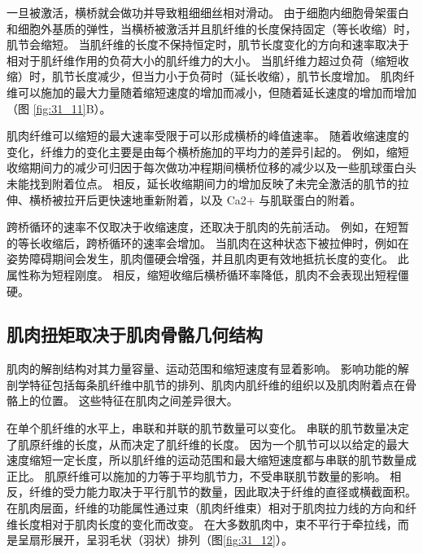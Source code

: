 一旦被激活，横桥就会做功并导致粗细细丝相对滑动。
由于细胞内细胞骨架蛋白和细胞外基质的弹性，当横桥被激活并且肌纤维的长度保持固定（等长收缩）时，肌节会缩短。
当肌纤维的长度不保持恒定时，肌节长度变化的方向和速率取决于相对于肌纤维作用的负荷大小的肌纤维力的大小。
当肌纤维力超过负荷（缩短收缩）时，肌节长度减少，但当力小于负荷时（延长收缩），肌节长度增加。
肌肉纤维可以施加的最大力量随着缩短速度的增加而减小，但随着延长速度的增加而增加（图 \ref{fig:31_11}B）。


肌肉纤维可以缩短的最大速率受限于可以形成横桥的峰值速率。
随着收缩速度的变化，纤维力的变化主要是由每个横桥施加的平均力的差异引起的。
例如，缩短收缩期间力的减少可归因于每次做功冲程期间横桥位移的减少以及一些肌球蛋白头未能找到附着位点。
相反，延长收缩期间力的增加反映了未完全激活的肌节的拉伸、横桥被拉开后更快速地重新附着，以及 Ca2+ 与肌联蛋白的附着。


跨桥循环的速率不仅取决于收缩速度，还取决于肌肉的先前活动。
例如，在短暂的等长收缩后，跨桥循环的速率会增加。
当肌肉在这种状态下被拉伸时，例如在姿势障碍期间会发生，肌肉僵硬会增强，并且肌肉更有效地抵抗长度的变化。
此属性称为短程刚度。
相反，缩短收缩后横桥循环率降低，肌肉不会表现出短程僵硬。


\subsection{肌肉扭矩取决于肌肉骨骼几何结构}

肌肉的解剖结构对其力量容量、运动范围和缩短速度有显着影响。
影响功能的解剖学特征包括每条肌纤维中肌节的排列、肌肉内肌纤维的组织以及肌肉附着点在骨骼上的位置。
这些特征在肌肉之间差异很大。


在单个肌纤维的水平上，串联和并联的肌节数量可以变化。
串联的肌节数量决定了肌原纤维的长度，从而决定了肌纤维的长度。
因为一个肌节可以以给定的最大速度缩短一定长度，所以肌纤维的运动范围和最大缩短速度都与串联的肌节数量成正比。
肌原纤维可以施加的力等于平均肌节力，不受串联肌节数量的影响。
相反，纤维的受力能力取决于平行肌节的数量，因此取决于纤维的直径或横截面积。
在肌肉层面，纤维的功能属性通过束（肌肉纤维束）相对于肌肉拉力线的方向和纤维长度相对于肌肉长度的变化而改变。
在大多数肌肉中，束不平行于牵拉线，而是呈扇形展开，呈羽毛状（羽状）排列（图\ref{fig:31_12}）。


